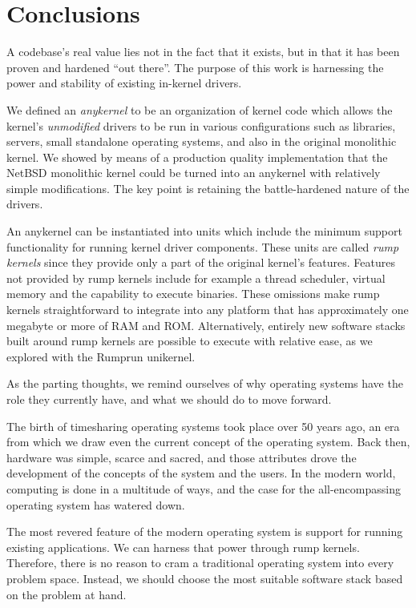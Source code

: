 
\section{Conclusions}
\label{chap:conclusions}

A codebase's real value lies not in the fact that it exists, but in that
it has been proven and hardened ``out there''.  The purpose of this work
is harnessing the power and stability of existing in-kernel drivers.

We defined an \textit{anykernel} to be an organization of kernel code
which allows the kernel's \textit{unmodified} drivers to be run in various
configurations such as libraries, servers, small standalone operating
systems, and also in the original monolithic kernel.  We showed by means
of a production quality implementation that the NetBSD monolithic kernel
could be turned into an anykernel with relatively simple modifications.
The key point is retaining the battle-hardened nature of the drivers.

An anykernel can be instantiated into units which include the minimum
support functionality for running kernel driver components.  These units
are called \textit{rump kernels} since they provide only a part of
the original kernel's features.  Features not provided by rump kernels
include for example a thread scheduler, virtual memory and the capability
to execute binaries.  These omissions make rump kernels straightforward
to integrate into any platform that has approximately one megabyte or
more of RAM and ROM.  Alternatively, entirely new software stacks built
around rump kernels are possible to execute with relative ease, as we
explored with the Rumprun unikernel.

As the parting thoughts, we remind ourselves of why operating systems
have the role they currently have, and what we should do to move
forward.

The birth of timesharing operating systems took place over 50 years ago,
an era from which we draw even the current concept of the operating system.
Back then, hardware was simple, scarce and sacred, and those attributes
drove the development of the concepts of the system and the users.
In the modern world, computing is done in a multitude of ways, and the
case for the all-encompassing operating system has watered down.

The most revered feature of the modern operating system is support for
running existing applications.  We can harness that power through rump
kernels.  Therefore, there is no reason to cram a traditional operating
system into every problem space.  Instead, we should choose
the most suitable software stack based on the problem at hand.

